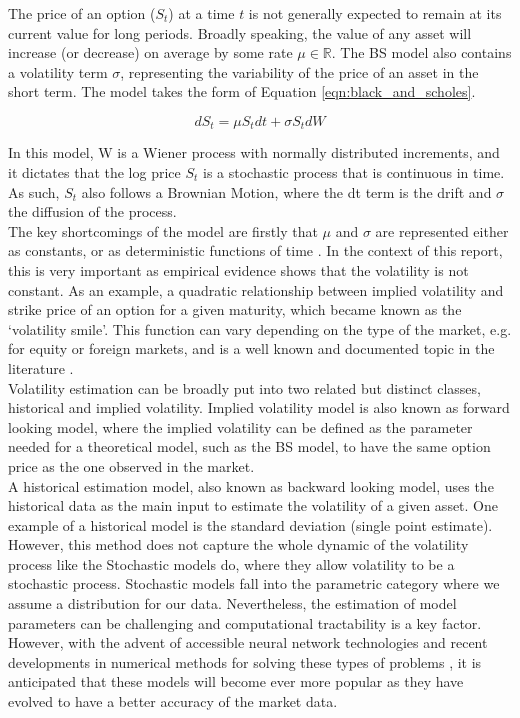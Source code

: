 \documentclass[12pt,oneside]{article}
\begin{document}
The price of an option ($S_t$) at a time $t$ is not generally expected to remain at its current value for long periods. Broadly speaking, the value of any asset will increase (or decrease) on average by some rate $\mu\in\mathbb{R}$. The BS model also contains a volatility term $\sigma$, representing the variability of the price of an asset in the short term. The model takes the form of Equation \ref{eqn:black_and_scholes}.

\begin{equation}
\label{eqn:black_and_scholes} 
dS_t=\mu S_t dt + \sigma S_t dW
\end{equation}

In this model, W is a Wiener process with normally distributed increments, and it dictates that the log price $S_t$ is a stochastic process that is continuous in time. As such, $S_t$ also follows a Brownian Motion, where the dt term is the drift and $\sigma$ the diffusion of the process. 
\\

The key shortcomings of the model are firstly that $\mu$ and $\sigma$ are represented either as constants, or as deterministic functions of time \cite{BlackScholes1973, Gatheral2014}. In the context of this report, this is very important as empirical evidence shows that the volatility is not constant. As an example, a quadratic relationship between implied volatility and strike price of an option for a given maturity, which became known as the `volatility smile'. This function can vary depending on the type of the market, e.g. for equity or foreign markets, and is a well known and documented topic in the literature \cite{Hull2015}.
\\

Volatility estimation can be broadly put into two related but distinct classes, historical and implied volatility. Implied volatility model is also known as forward looking model, where the implied volatility can be defined as the parameter needed for a theoretical model, such as the BS model, to have the same option price as the one observed in the market.
\\

A historical estimation model, also known as backward looking model, uses the historical data as the main input to estimate the volatility of a given asset. One example of a historical model is the standard deviation (single point estimate). However, this method does not capture the whole dynamic of the volatility process like the Stochastic models do, where they allow volatility to be a stochastic process. Stochastic models fall into the parametric category where we assume a distribution for our data. Nevertheless, the estimation of model parameters can be challenging and computational tractability is a key factor. However, with the advent of accessible neural network technologies and recent developments in numerical methods for solving these types of problems \cite{Horvath2019}, it is anticipated that these models will become ever more popular as they have evolved to have a better accuracy of the market data.
\\
\end{document}
